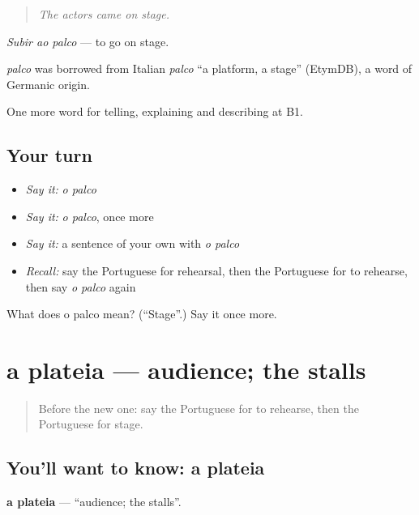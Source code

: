 \begin{quote}
\emph{The actors came on stage.}
\end{quote}

\emph{Subir ao palco} — to go on stage.

\begin{cousinweb}
\emph{palco} was borrowed from Italian \emph{palco} \textquotedblleft{}a platform, a stage\textquotedblright{} (EtymDB), a word of Germanic origin.
\end{cousinweb}

\begin{grammarlens}[title={What you've built}]
One more word for telling, explaining and describing at B1.
\end{grammarlens}

\subsection*{Your turn}
\begin{itemize}
\raggedright
  \item \emph{Say it:} \emph{o palco}
  \item \emph{Say it:} \emph{o palco}, once more
  \item \emph{Say it:} a sentence of your own with \emph{o palco}
  \item \emph{Recall:} say the Portuguese for rehearsal, then the Portuguese for to rehearse, then say \emph{o palco} again
\end{itemize}

\begin{tcolorbox}[breakable,colback=teal!4,colframe=teal!35!black,title={Before you move on}]
What does o palco mean? (\textquotedblleft{}Stage\textquotedblright{}.) Say it once more.
\end{tcolorbox}
\section[a plateia]{a plateia — audience; the stalls}

\label{lesson:PT-C519-plateia}



\begin{quote}
Before the new one: say the Portuguese for to rehearse, then the Portuguese for stage.
\end{quote}

\subsection*{You'll want to know: a plateia}
\textbf{a plateia} — \textquotedblleft{}audience; the stalls\textquotedblright{}.

